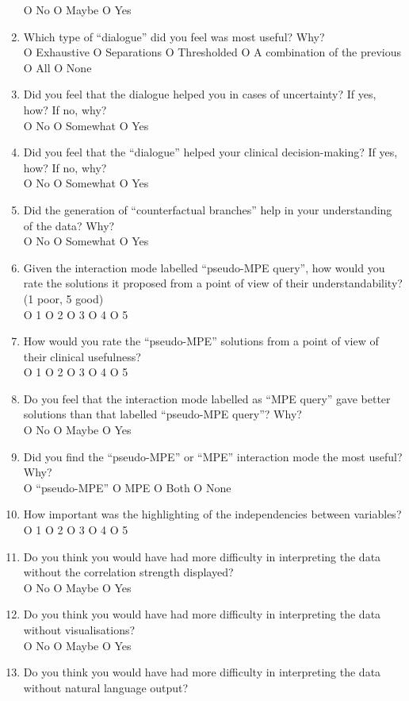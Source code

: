 \begin{mdframed}
\begin{enumerate}[resume]
		O No O Maybe O Yes
		\item Which type of \enquote{dialogue} did you feel was most useful? Why? \\
		O Exhaustive O Separations O Thresholded O A combination of the previous O All O None
		\item Did you feel that the dialogue helped you in cases of uncertainty?  If yes, how?  If no, why? \\
		O No O Somewhat O Yes
		\item Did you feel that the \enquote{dialogue} helped your clinical decision-making?  If yes, how?  If no, why? \\
		O No O Somewhat O Yes
		\item Did the generation of \enquote{counterfactual branches} help in your understanding of the data?  Why? \\
		O No O Somewhat O Yes
		\item Given the interaction mode labelled \enquote{pseudo-MPE query}, how would you rate the solutions it proposed from a point of view of their understandability? (1 poor, 5 good) \\
		O 1 O 2 O 3 O 4 O 5
		\item How would you rate the \enquote{pseudo-MPE} solutions from a point of view of their clinical usefulness? \\
		O 1 O 2 O 3 O 4 O 5
		\item Do you feel that the interaction mode labelled as \enquote{MPE query} gave better solutions than that labelled \enquote{pseudo-MPE query}?  Why? \\
		O No O Maybe O Yes
		\item Did you find the \enquote{pseudo-MPE} or \enquote{MPE} interaction mode the most useful?  Why? \\
		O \enquote{pseudo-MPE} O MPE O Both O None
		\item How important was the highlighting of the independencies between variables? \\
		O 1 O 2 O 3 O 4 O 5
		\item Do you think you would have had more difficulty in interpreting the data without the correlation strength displayed? \\
		O No O Maybe O Yes
		\item Do you think you would have had more difficulty in interpreting the data without visualisations? \\
		O No O Maybe O Yes
		\item Do you think you would have had more difficulty in interpreting the data without natural language output? \\

\end{enumerate}
\end{mdframed}
